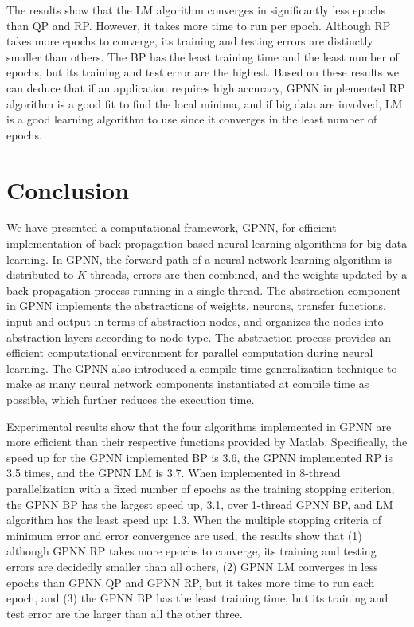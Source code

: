 \documentclass[procedia]{easychair}
\begin{document}
The results show that the LM algorithm converges in significantly less epochs than QP and RP.  However, it takes more time to run per epoch.  Although RP takes more epochs to converge, its training and testing errors are distinctly smaller than others.  The BP has the least training time and the least number of epochs, but its training and test error are the highest.  Based on these results we can deduce that if an application requires high accuracy, GPNN implemented RP algorithm is a good fit to find the local minima, and if big data are involved, LM is a good learning algorithm to use since it converges in the least number of epochs.


\section{Conclusion}
\label{section:conclusion}

We have presented a computational framework, GPNN, for efficient implementation of back-propagation based neural learning algorithms for big data learning. In GPNN, the forward path of a neural network learning algorithm is distributed to $K$-threads, errors are then combined, and the weights updated by a back-propagation process running in a single thread.   The abstraction component in GPNN implements the abstractions of weights, neurons, transfer functions, input and output in terms of abstraction nodes, and organizes the nodes into abstraction layers according to node type. The abstraction process provides an efficient computational environment for parallel computation during neural learning.  The GPNN also introduced a compile-time generalization technique to make as many neural network components instantiated at compile time as possible, which further reduces the execution time.

Experimental results show that the four algorithms implemented in GPNN are more efficient than their respective functions provided by Matlab.  Specifically, the speed up for the GPNN implemented BP is 3.6, the GPNN implemented RP is 3.5 times, and the GPNN LM is 3.7.  When implemented in 8-thread parallelization with a fixed number of epochs as the training stopping criterion, the GPNN BP has the largest speed up, 3.1, over 1-thread GPNN BP, and LM algorithm has the least speed up: 1.3.  When the multiple stopping criteria of minimum error and error convergence are used, the results show that (1) although GPNN RP takes more epochs to converge, its training and testing errors are decidedly smaller than all others, (2) GPNN LM converges in less epochs than GPNN QP and GPNN RP, but it takes more time to run each epoch, and (3) the GPNN BP has the least training time, but its training and test error are the larger than all the other three.
\end{document}

